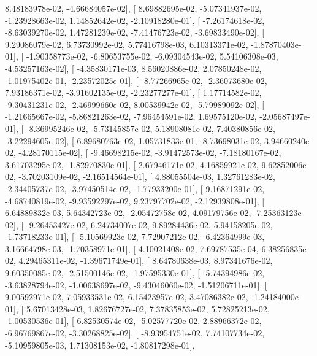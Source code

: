 \documentclass{article}
\begin{document}
          8.48183978e-02,  -4.66684057e-02],
       [  8.69882695e-02,  -5.07341937e-02,  -1.23928663e-02,
          1.14852642e-02,  -2.10918280e-01],
       [ -7.26174618e-02,  -8.63039270e-02,   1.47281239e-02,
         -7.41476723e-02,  -3.69833490e-02],
       [  9.29086079e-02,   6.73730992e-02,   5.77416798e-03,
          6.10313371e-02,  -1.87870403e-01],
       [ -1.90358773e-02,  -6.80653755e-02,  -6.09304543e-02,
          5.54106308e-03,  -4.53257163e-02],
       [ -4.35830171e-03,   8.56020886e-02,   2.07850248e-02,
         -1.01975402e-01,  -2.23572025e-01],
       [ -8.77266965e-02,  -2.36073680e-02,   7.93186371e-02,
         -3.91602135e-02,  -2.23277277e-01],
       [  1.17714582e-02,  -9.30431231e-02,  -2.46999660e-02,
          8.00539942e-02,  -5.79989092e-02],
       [ -1.21665667e-02,  -5.86821263e-02,  -7.96454591e-02,
          1.69575120e-02,  -2.05687497e-01],
       [ -8.36995246e-02,  -5.73145857e-02,   5.18908081e-02,
          7.40380856e-02,  -3.22294605e-02],
       [  6.89680763e-02,   1.05731833e-01,  -8.73698031e-02,
          3.94660240e-02,  -4.28170115e-02],
       [ -9.46698215e-02,  -3.91472573e-02,  -7.18180167e-02,
          3.61703295e-02,  -1.82970830e-01],
       [  2.67946171e-02,   4.16859921e-02,   9.62852006e-02,
         -3.70203109e-02,  -2.16514564e-01],
       [  4.88055504e-03,   1.32761283e-02,  -2.34405737e-02,
         -3.97450514e-02,  -1.77933200e-01],
       [  9.16871291e-02,  -4.68740819e-02,  -9.93592297e-02,
          9.23797702e-02,  -2.12939808e-01],
       [  6.64889832e-03,   5.64342723e-02,  -2.05472758e-02,
          4.09179756e-02,  -7.25363123e-02],
       [ -9.26453427e-02,   6.24734007e-02,   9.89284436e-02,
          5.94158205e-02,  -1.73718233e-01],
       [ -5.10569923e-02,   7.72907212e-02,  -6.42364999e-03,
          3.16664798e-03,  -1.70358971e-01],
       [  4.10021408e-02,   7.69787535e-04,   6.38256835e-02,
          4.29465311e-02,  -1.39671749e-01],
       [  8.64780638e-03,   8.97341676e-02,   9.60350085e-02,
         -2.51500146e-02,  -1.97595330e-01],
       [ -5.74394986e-02,  -3.63828794e-02,  -1.00638697e-02,
         -9.43046060e-02,  -1.51206711e-01],
       [  9.00592971e-02,   7.05933531e-02,   6.15423957e-02,
          3.47086382e-02,  -1.24184000e-01],
       [  5.67013428e-03,   1.82676727e-02,   7.37835853e-02,
          5.72825213e-02,  -1.00530536e-01],
       [  6.82530574e-02,  -5.02577720e-02,   2.88966372e-02,
         -6.96769867e-02,  -3.30268825e-02],
       [ -8.93954751e-02,   7.74107734e-02,  -5.10959805e-03,
          1.71308153e-02,  -1.80817298e-01],
\end{document}
